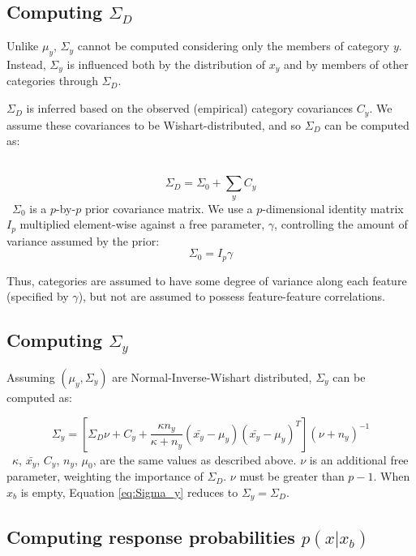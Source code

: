 \documentclass[12pt]{article}
\begin{document}
\subsection*{Computing $\Sigma_D$}

Unlike $\mu_y$, $\Sigma_y$ cannot be computed considering only the members of category $y$. Instead, $\Sigma_y$ is influenced both by the distribution of $x_y$ and by members of other categories through $\Sigma_D$.

$\Sigma_D$ is inferred based on the observed (empirical) category covariances $C_y$. We assume these covariances to be Wishart-distributed, and so $\Sigma_D$ can be computed as:

\
\begin{equation}
    \Sigma_D = \Sigma_0 + \sum_{y}{C_y}
\end{equation}
\
$\Sigma_{0}$ is a $p$-by-$p$ prior covariance matrix. We use a $p$-dimensional identity matrix $I_p$ multiplied element-wise against a free parameter, $\gamma$, controlling the amount of variance assumed by the prior:
\
\begin{equation}
    \Sigma_0 =  I_p\gamma
\end{equation}

Thus, categories are assumed to have some degree of variance along each feature (specified by $\gamma$), but not are assumed to possess feature-feature correlations.

\subsection*{Computing $\Sigma_y$}

Assuming $(\mu_y, \Sigma_y)$ are Normal-Inverse-Wishart distributed, $\Sigma_y$ can be computed as:

\begin{equation}
  \Sigma_y = [\Sigma_D\nu + C_y +
    \dfrac
    {\kappa n_y}
    {\kappa + n_y}
    (\bar{x_y}-\mu_y)(\bar{x_y}-\mu_y)^T
  ] (\nu + n_y)^{-1}
  \label{eq:Sigma_y}
\end{equation}
\
$\kappa$, $\bar{x_y}$, $C_y$, $n_y$, $\mu_0$,  are the same values as described above. $\nu$ is an additional free parameter, weighting the importance of $\Sigma_{D}$. $\nu$ must be greater than $p-1$. When $x_b$ is empty, Equation \ref{eq:Sigma_y} reduces to $\Sigma_y = \Sigma_D$. 

\subsection*{Computing response probabilities $p(x | x_b)$}
\end{document}
